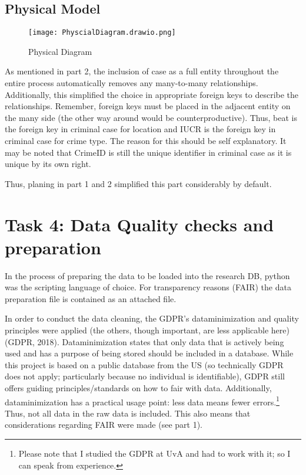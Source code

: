 \documentclass[a4paper]{article}
\begin{document}
\subsection{Physical Model}


\begin{figure}[htp]
		\centering
			\texttt{[image: PhyscialDiagram.drawio.png]}
         \small
         \caption{Physical Diagram}
\end{figure}

As mentioned in part 2, the inclusion of case as a full entity throughout the entire process automatically removes any many-to-many relationships. Additionally, this simplified the choice in appropriate foreign keys to describe the relationships. Remember, foreign keys must be placed in the adjacent entity on the many side (the other way around would be counterproductive). Thus, beat is the foreign key in criminal case for location and IUCR is the foreign key in criminal case for crime type. The reason for this should be self explanatory. It may be noted that CrimeID is still the unique identifier in criminal case as it is unique by its own right. 

Thus, planing in part 1 and 2 simplified this part considerably by default. 


\section{Task 4: Data Quality checks and preparation}

In the process of preparing the data to be loaded into the research DB, python was the scripting language of choice. For transparency reasons (FAIR) the data preparation file is contained as an attached file. 

In order to conduct the data cleaning, the GDPR's dataminimization and quality principles were applied (the others, though important, are less applicable here) (GDPR, 2018). Dataminimization states that only data that is actively being used and has a purpose of being stored should be included in a database. While this project is based on a public database from the US (so technically GDPR does not apply; particularly because no individual is identifiable), GDPR still offers guiding principles/standards on how to fair with data. Additionally, dataminimization has a practical usage point: less data means fewer errors.\footnote{Please note that I studied the GDPR at UvA and had to work with it; so I can speak from experience.} Thus, not all data in the raw data is included. This also means that considerations regarding FAIR were made (see part 1).  
\end{document}

